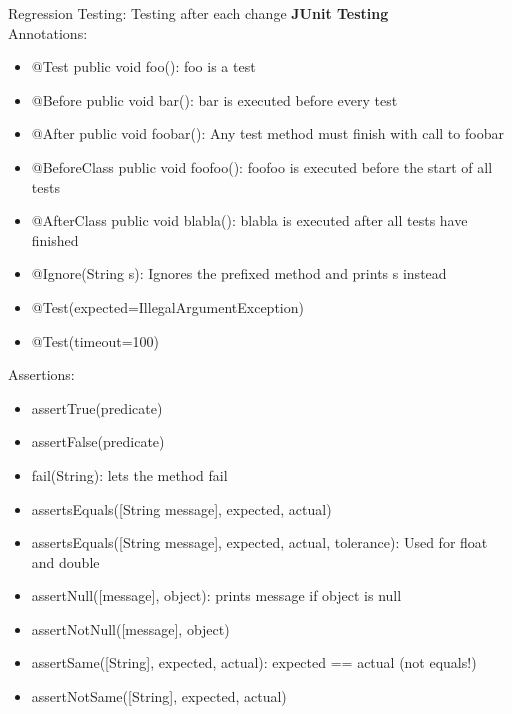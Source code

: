Regression Testing: Testing after each change
\newpage
\textbf{JUnit Testing}\\
Annotations:
\vspace{-.5em}
\begin{itemize}
  \item @Test public void foo(): foo is a test
  \item @Before public void bar(): bar is executed before every test
  \item @After public void foobar(): Any test method must finish with call to foobar
  \item @BeforeClass public void foofoo(): foofoo is executed before the start of all tests
  \item @AfterClass public void blabla(): blabla is executed after all tests have finished
  \item @Ignore(String s): Ignores the prefixed method and prints s instead
  \item @Test(expected=IllegalArgumentException)
  \item @Test(timeout=100)
\end{itemize}
Assertions:
\vspace{-.5em}
\begin{itemize}
  \item assertTrue(predicate)
  \item assertFalse(predicate)
  \item fail(String): lets the method fail
  \item assertsEquals([String message], expected, actual)
  \item assertsEquals([String message], expected, actual, tolerance): Used for float and double
  \item assertNull([message], object): prints message if object is null
  \item assertNotNull([message], object)
  \item assertSame([String], expected, actual): expected == actual (not equals!)
  \item assertNotSame([String], expected, actual)
\end{itemize}
\newpage

